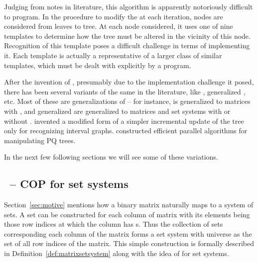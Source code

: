 Judging from notes in literature, this algorithm is apparently
notoriously difficult to program. In the procedure to modify the
\PQtree at each iteration, nodes are considered from leaves to
tree. At each node considered, it uses one of nine templates to
determine how the tree must be altered in the vicinity of this
node. Recognition of this template poses a difficult challenge in
terms of implementing it. Each template is actually a representative
of a larger class of similar templates, which must be dealt with
explicitly by a program\cite{mcc04}.


After the invention of \PQtrees, presumably due to the implementation
challenge it posed, there has been several variants of the same in the
literature, like \PCtree \cite{sh99,wlh01,hm03}, generalized \PQtree
\cite{km89,mcc04}, \PQRtree \cite{mm96,mpt98} etc. Most of these are
generalizations of \PQtree -- for instance, \PCtree is generalized to
matrices with \CROP, \PQRtree and generalized \PQtree are generalized
to matrices and set systems with or without \COP. \cite{km89} invented
a modified form of \PQtree a simpler incremental update of the tree
only for recognizing interval graphs.  \cite{kr88} constructed
efficient parallel algorithms for manipulating PQ trees. 

In the next few following sections we will see some of these
variations.


\subsection{\PQRtree\ --  COP for set systems}
\label{sec:surveycertalgo}

Section~\ref{sec:motive} mentions how a binary matrix naturally maps
to a system of sets.  A set can be constructed for each column of
matrix with its elements being those row indices at which the column
has \un s. Thus the collection of sets corresponding each column of
the matrix forms a set system with universe as the set of all row
indices of the matrix.  This simple construction is formally described
in Definition~\ref{def:matrixsetsystem} along with the idea of \cop
for set systems.


